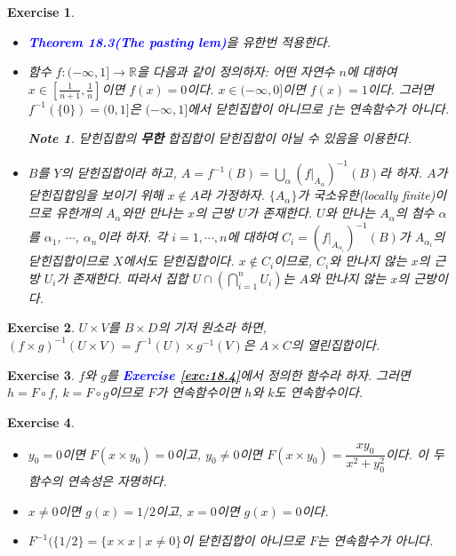 \documentclass{article}
\newtheorem{exercise}{Exercise}[section]
\newtheorem*{note}{Note}
\newcommand{\R}{\mathbb{R}}
\begin{document}
\begin{exercise}
    \phantom{}
    \begin{itemize}
        \item[(a)] \textcolor{blue}{\textbf{Theorem 18.3(The pasting lem)}}을 유한번 적용한다.
        \item[(b)] 함수 $f:(-\infty,1]\to \R$을 다음과 같이 정의하자: 어떤 자연수 $n$에 대하여 $x\in\left[\frac{1}{n+1},\frac{1}{n}\right]$이면 $f(x)=0$이다. $x\in(-\infty,0]$이면 $f(x)=1$이다. 그러면 $f^{-1}(\{0\})=(0,1]$은 $(-\infty, 1]$에서 닫힌집합이 아니므로 $f$는 연속함수가 아니다.
            \begin{note}
                닫힌집합의 \textbf{무한} 합집합이 닫힌집합이 아닐 수 있음을 이용한다.
            \end{note}
        \item[(c)] $B$를 $Y$의 닫힌집합이라 하고, $A=f^{-1}(B)=\bigcup_\alpha(f\vert_{A_\alpha})^{-1}(B)$라 하자. $A$가 닫힌집합임을 보이기 위해 $x\notin A$라 가정하자. $\{A_\alpha\}$가 국소유한(locally finite)이므로 유한개의 $A_\alpha$와만 만나는 $x$의 근방 $U$가 존재한다. $U$와 만나는 $A_\alpha$의 첨수 $\alpha$를 $\alpha_1$, $\cdots$, $\alpha_n$이라 하자. 각 $i=1,\cdots,n$에 대하여 $C_i=(f\vert_{A_{\alpha_i}})^{-1}(B)$가 $A_{\alpha_i}$의 닫힌집합이므로 $X$에서도 닫힌집합이다. $x\notin C_i$이므로, $C_i$와 만나지 않는 $x$의 근방 $U_i$가 존재한다. 따라서 집합 $U\cap(\bigcap_{i=1}^nU_i)$는 $A$와 만나지 않는 $x$의 근방이다.
    \end{itemize}
\end{exercise}

\begin{exercise}
	\label{exc:18.10}
    $U\times V$를 $B\times D$의 기저 원소라 하면, $(f\times g)^{-1}(U\times V)=f^{-1}(U)\times g^{-1}(V)$은 $A\times C$의 열린집합이다.
\end{exercise}

\begin{exercise}
	\label{exc:18.11}
    $f$와 $g$를 \textcolor{blue}{\textbf{Exercise \ref{exc:18.4}}}에서 정의한 함수라 하자. 그러면 $h=F\circ f$, $k=F\circ g$이므로 $F$가 연속함수이면 $h$와 $k$도 연속함수이다.
\end{exercise}

\begin{exercise}
    \phantom{}
    \begin{itemize}
        \item[(a)] $y_0=0$이면 $F(x\times y_0)=0$이고, $y_0\ne0$이면 $F(x\times y_0)=\dfrac{xy_0}{x^2+y_0^2}$이다. 이 두 함수의 연속성은 자명하다.
        \item[(b)] $x\ne0$이면 $g(x)=1/2$이고, $x=0$이면 $g(x)=0$이다.
        \item[(c)] $F^{-1}(\{1/2\}=\{x\times x\mid x\ne0\}$이 닫힌집합이 아니므로 $F$는 연속함수가 아니다.
    \end{itemize}
\end{exercise}
\end{document}
